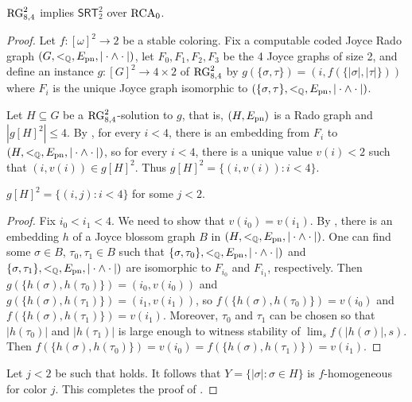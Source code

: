 \begin{theorem}\label{thm:rg284-implies-srt22}
$\mathrm{RG}^2_{8,4}$ implies $\mathsf{SRT}^2_2$ over $\mathrm{RCA}_0$.
\end{theorem}
\begin{proof}
Let $f: [\omega]^2 \to 2$ be a stable coloring. 
Fix a computable coded Joyce Rado graph $(G, <_{\mathbb{Q}}, E_{\mathrm{pn}}, |\cdot \wedge \cdot|)$,
let $F_0, F_1, F_2, F_3$ be the 4 Joyce graphs of size 2, 
and define an instance $g: [G]^2 \to 4 \times 2$ of $\mathrm{RG}^2_{8,4}$ by $g(\{\sigma, \tau\}) = (i, f(\{|\sigma|, |\tau|\}))$ where $F_i$ is the unique Joyce graph isomorphic to $(\{\sigma, \tau\}, <_{\mathbb{Q}}, E_{\mathrm{pn}}, |\cdot \wedge \cdot|)$. 

Let $H \subseteq G$ be a $\mathrm{RG}^2_{8,4}$-solution to $g$, that is, 
$(H, E_{\mathrm{pn}})$ is a Rado graph and $|g[H]^2| \leq 4$.
By , for every $i < 4$, there is an embedding from $F_i$ to $(H, <_{\mathbb{Q}}, E_{\mathrm{pn}}, |\cdot \wedge \cdot|)$, so for every $i < 4$, there is a unique value $v(i) < 2$ such that $(i, v(i)) \in g[H]^2$. Thus $g[H]^2 = \{(i, v(i)): i < 4\}$.

\begin{claim}\label{claim:rg284-implies-srt22-monochromatic}
$g[H]^2 = \{(i, j): i < 4\}$ for some $j < 2$.
\end{claim}
\begin{proof}
Fix $i_0 < i_1 < 4$. We need to show that $v(i_0) = v(i_1)$.
By , there is an embedding $h$ of a Joyce blossom graph $B$ in $(H, <_{\mathbb{Q}}, E_{\mathrm{pn}}, |\cdot \wedge \cdot|)$. One can find some $\sigma \in B$, $\tau_0, \tau_1 \in B$
such that $\{\sigma, \tau_0\}, <_{\mathbb{Q}}, E_{\mathrm{pn}}, |\cdot \wedge \cdot|)$ and $\{\sigma, \tau_1\}, <_{\mathbb{Q}}, E_{\mathrm{pn}}, |\cdot \wedge \cdot|)$ are isomorphic to $F_{i_0}$ and $F_{i_1}$, respectively.
Then $g(\{h(\sigma), h(\tau_0)\}) = (i_0, v(i_0))$ and $g(\{h(\sigma), h(\tau_1)\}) = (i_1, v(i_1))$, so $f(\{h(\sigma), h(\tau_0)\}) = v(i_0)$ and $f(\{h(\sigma), h(\tau_1)\}) = v(i_1)$.
Moreover, $\tau_0$ and $\tau_1$ can be chosen so that $|h(\tau_0)|$ and $|h(\tau_1)|$ is large enough to witness stability of $\lim_s f(|h(\sigma)|, s)$.
Then $f(\{h(\sigma), h(\tau_0)\}) = v(i_0) = f(\{h(\sigma), h(\tau_1)\}) = v(i_1)$.
\end{proof}

Let $j < 2$ be such that  holds.
It follows that $Y = \{|\sigma|: \sigma \in H \}$ is $f$-homogeneous for color $j$.
This completes the proof of .
\end{proof}

